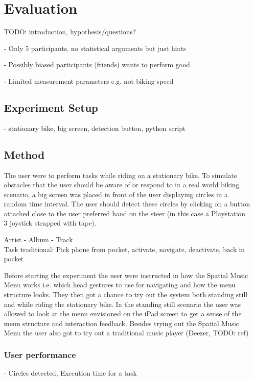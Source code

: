 \chapter{Evaluation}
TODO: introduction, hypothesis/questions?

- Only 5 participants, no statistical arguments but just hints

- Possibly biased participants (friends) wants to perform good

- Limited measurement parameters e.g. not biking speed


\section{Experiment Setup}
- stationary bike, big screen, detection button, python script


\section{Method}
The user were to perform tasks while riding on a stationary bike. To simulate obstacles that the user should be aware of or respond to in a real world biking scenario, a big screen was placed in front of the user displaying circles in a random time interval. The user should detect these circles by clicking on a button attached close to the user preferred hand on the steer (in this case a Playstation 3 joystick strapped with tape).

Artist - Album - Track\\
Task traditional: Pick phone from pocket, activate, navigate, deactivate, back in pocket

Before starting the experiment the user were instructed in how the Spatial Music Menu works i.e. which head gestures to use for navigating and how the menu structure looks. They then got a chance to try out the system both standing still and while riding the stationary bike. In the standing still scenario the user was allowed to look at the menu envisioned on the iPad screen to get a sense of the menu structure and interaction feedback. Besides trying out the Spatial Music Menu the user also got to try out a traditional music player (Deezer, TODO: ref)

\subsection{User performance}
- Circles detected, Execution time for a task

